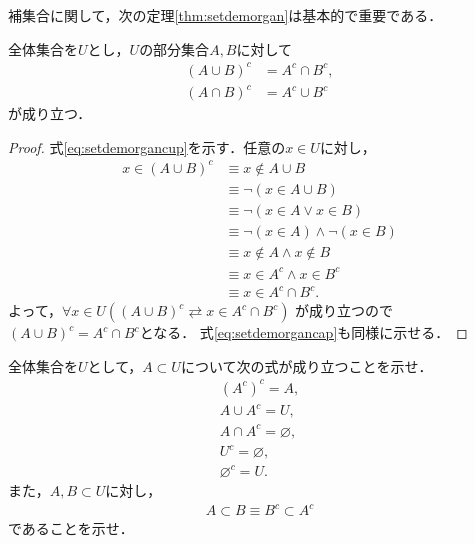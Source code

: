    補集合に関して，次の定理\ref{thm:setdemorgan}は基本的で重要である．
   \begin{thm} \label{thm:setdemorgan}
     全体集合を$U$とし，$U$の部分集合$A,  B$に対して
     \begin{align}
       (A \cup B)^c & = A^c \cap B^c ,
       \label{eq:setdemorgancup} \\
       (A \cap B)^c & = A^c \cup B^c
       \label{eq:setdemorgancap}
     \end{align}
     が成り立つ．
   \end{thm}
   \begin{proof} 
     式\eqref{eq:setdemorgancup}を示す．任意の$x \in U$に対し，
     \begin{align*}
       x \in (A \cup B)^c & \equiv x \notin A \cup B \\
                          & \equiv \lnot( x \in A \cup B) \\
                          & \equiv \lnot (x \in A \lor x \in B) \\
                          & \equiv \lnot (x \in A) \land \lnot (x \in B) \\
                          & \equiv x \notin A \land x \notin B \\
                          & \equiv x \in A^c \land x \in B^c \\
                          & \equiv x \in A^c \cap B^c.
     \end{align*}
     よって，$\forall x \in U ( (A \cup B)^c \rightleftarrows x \in A^c \cap B^c)$
     が成り立つので$(A \cup B)^c = A^c \cap B^c$となる．
     式\eqref{eq:setdemorgancap}も同様に示せる．
   \end{proof}
   \begin{que} \label{que:univarseset}
     全体集合を$U$として，$A \subset U$について次の式が成り立つことを示せ．
     \begin{align}
       (A^c)^c = A,
       \label{eq:ccA} \\
       A \cup A^c = U, 
       \label{eq:AAcU} \\
       A \cap A^c = \varnothing ,
       \label{eq:AAcvarnothing} \\
       U^c = \varnothing ,
       \label{eq:Ucvarnothing} \\
       \varnothing ^c = U. 
       \label{eq:varnothingcU} 
     \end{align}
     また，$A,  B \subset U$に対し，
     \begin{align}
       A \subset B \equiv B^c \subset A^c
       \label{eq:settaiguu}
     \end{align}
     であることを示せ．
   \end{que}


